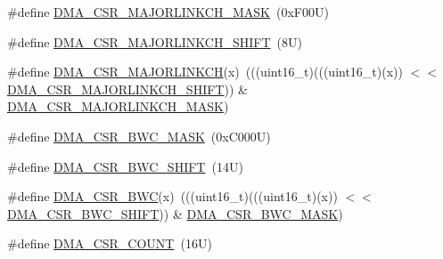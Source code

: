 \begin{DoxyCompactItemize}
\item 
\#define \mbox{\hyperlink{group___d_m_a___register___masks_ga46d684508f50948c307efc8c3411345f}{D\+M\+A\+\_\+\+C\+S\+R\+\_\+\+M\+A\+J\+O\+R\+L\+I\+N\+K\+C\+H\+\_\+\+M\+A\+SK}}~(0x\+F00\+U)
\item 
\#define \mbox{\hyperlink{group___d_m_a___register___masks_gab34f787f2b2a3a927614699cfe50051d}{D\+M\+A\+\_\+\+C\+S\+R\+\_\+\+M\+A\+J\+O\+R\+L\+I\+N\+K\+C\+H\+\_\+\+S\+H\+I\+FT}}~(8\+U)
\item 
\#define \mbox{\hyperlink{group___d_m_a___register___masks_ga6215f32eef477970761eb917884b6fa7}{D\+M\+A\+\_\+\+C\+S\+R\+\_\+\+M\+A\+J\+O\+R\+L\+I\+N\+K\+CH}}(x)~(((uint16\+\_\+t)(((uint16\+\_\+t)(x)) $<$$<$ \mbox{\hyperlink{group___d_m_a___register___masks_gab34f787f2b2a3a927614699cfe50051d}{D\+M\+A\+\_\+\+C\+S\+R\+\_\+\+M\+A\+J\+O\+R\+L\+I\+N\+K\+C\+H\+\_\+\+S\+H\+I\+FT}})) \& \mbox{\hyperlink{group___d_m_a___register___masks_ga46d684508f50948c307efc8c3411345f}{D\+M\+A\+\_\+\+C\+S\+R\+\_\+\+M\+A\+J\+O\+R\+L\+I\+N\+K\+C\+H\+\_\+\+M\+A\+SK}})
\item 
\#define \mbox{\hyperlink{group___d_m_a___register___masks_ga1ff3a4e1294d6ea9b00b675241d79a60}{D\+M\+A\+\_\+\+C\+S\+R\+\_\+\+B\+W\+C\+\_\+\+M\+A\+SK}}~(0x\+C000\+U)
\item 
\#define \mbox{\hyperlink{group___d_m_a___register___masks_gaf5c958b45ed9544b9877d50b330f2115}{D\+M\+A\+\_\+\+C\+S\+R\+\_\+\+B\+W\+C\+\_\+\+S\+H\+I\+FT}}~(14\+U)
\item 
\#define \mbox{\hyperlink{group___d_m_a___register___masks_gabf096c1882a693d928756d1dbaba8ece}{D\+M\+A\+\_\+\+C\+S\+R\+\_\+\+B\+WC}}(x)~(((uint16\+\_\+t)(((uint16\+\_\+t)(x)) $<$$<$ \mbox{\hyperlink{group___d_m_a___register___masks_gaf5c958b45ed9544b9877d50b330f2115}{D\+M\+A\+\_\+\+C\+S\+R\+\_\+\+B\+W\+C\+\_\+\+S\+H\+I\+FT}})) \& \mbox{\hyperlink{group___d_m_a___register___masks_ga1ff3a4e1294d6ea9b00b675241d79a60}{D\+M\+A\+\_\+\+C\+S\+R\+\_\+\+B\+W\+C\+\_\+\+M\+A\+SK}})
\item 
\#define \mbox{\hyperlink{group___d_m_a___register___masks_ga85e4cdc8970aa81a6096c5b7f2c6010e}{D\+M\+A\+\_\+\+C\+S\+R\+\_\+\+C\+O\+U\+NT}}~(16\+U)
\end{DoxyCompactItemize}
